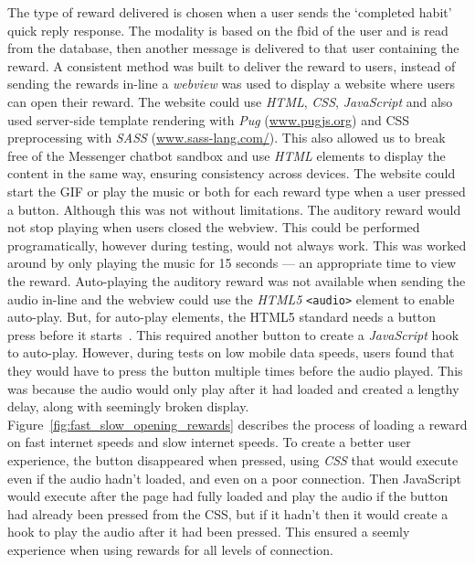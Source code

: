 The type of reward delivered is chosen when a user sends the `completed habit' quick reply response. The modality is based on the fbid of the user and is read from the database, then another message is delivered to that user containing the reward. A consistent method was built to deliver the reward to users, instead of sending the rewards in-line a \textit{webview} was used to display a website where users can open their reward. The website could use \textit{HTML}, \textit{CSS}, \textit{JavaScript} and also used server-side template rendering with \textit{Pug} (\url{www.pugjs.org}) and CSS preprocessing with \textit{SASS} (\url{www.sass-lang.com/}). This also allowed us to break free of the Messenger chatbot sandbox and use \textit{HTML} elements to display the content in the same way, ensuring consistency across devices. The website could start the GIF or play the music or both for each reward type when a user pressed a button. Although this was not without limitations. The auditory reward would not stop playing when users closed the webview. This could be performed programatically, however during testing, would not always work. This was worked around by only playing the music for 15 seconds --- an appropriate time to view the reward. Auto-playing the auditory reward was not available when sending the audio in-line and the webview could use the \textit{HTML5} \verb|<audio>| element to enable auto-play.
But, for auto-play elements, the HTML5 standard needs a button press before it starts~\cite{mozilla_autoplay}.
This required another button to create a \textit{JavaScript} hook to auto-play.
However, during tests on low mobile data speeds, users found that they would have to press the button multiple times before the audio played.
This was because the audio would only play after it had loaded and created a lengthy delay, along with seemingly broken display.
Figure~\ref{fig:fast_slow_opening_rewards} describes the process of loading a reward on fast internet speeds and slow internet speeds. To create a better user experience, the button disappeared when pressed, using \textit{CSS} that would execute even if the audio hadn't loaded, and even on a poor connection.
Then JavaScript would execute after the page had fully loaded and play the audio if the button had already been pressed from the CSS, but if it hadn't then it would create a hook to play the audio after it had been pressed.
This ensured a seemly experience when using rewards for all levels of connection.

